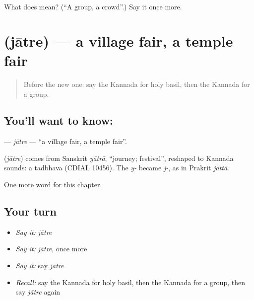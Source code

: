 \begin{tcolorbox}[breakable,colback=teal!4,colframe=teal!35!black,title={Before you move on}]
What does  mean? (\textquotedblleft{}A group, a crowd\textquotedblright{}.) Say it once more.
\end{tcolorbox}
\section[\texorpdfstring{\kn{ಜಾತ್ರೆ} (jātre)}{ಜಾತ್ರೆ (jātre)}]{ (jātre) — a village fair, a temple fair}

\label{lesson:KA-C189-jatre}



\begin{quote}
Before the new one: say the Kannada for holy basil, then the Kannada for a group.
\end{quote}

\subsection*{You'll want to know: }
\textbf{} — \emph{jātre} — \textquotedblleft{}a village fair, a temple fair\textquotedblright{}.

\begin{cousinweb}
\textbf{} (\emph{jātre}) comes from Sanskrit \emph{yātrā}, \textquotedblleft{}journey; festival\textquotedblright{}, reshaped to Kannada sounds: a tadbhava (CDIAL 10456). The \emph{y-} became \emph{j-}, as in Prakrit \emph{jattā}.
\end{cousinweb}

\begin{grammarlens}[title={What you've built}]
One more word for this chapter.
\end{grammarlens}

\subsection*{Your turn}
\begin{itemize}
\raggedright
  \item \emph{Say it:} \emph{jātre}
  \item \emph{Say it:} \emph{jātre}, once more
  \item \emph{Say it:} say \emph{jātre}
  \item \emph{Recall:} say the Kannada for holy basil, then the Kannada for a group, then say \emph{jātre} again
\end{itemize}

